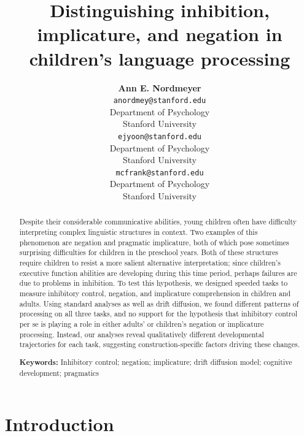 \documentclass[10pt,letterpaper]{article}
\title{Distinguishing inhibition, implicature, and negation in children's language processing}
\author{{\large \bf Ann E. Nordmeyer} \\
 \texttt{anordmey@stanford.edu} \\
 Department of Psychology \\
 Stanford University
 \And {\large \bf Erica J. Yoon} \\
 \texttt{ejyoon@stanford.edu} \\
 Department of Psychology \\
 Stanford University
 \And {\large \bf Michael C. Frank} \\
 \texttt{mcfrank@stanford.edu} \\
 Department of Psychology \\
 Stanford University}
\newcommand{\ejy}[1]{\textcolor{Blue}{[ejy: #1]}}
\newcommand{\aen}[1]{\textcolor{DarkOrange}{[aen: #1]}}
\begin{document}
\maketitle


\begin{abstract}

Despite their considerable communicative abilities, young children often have difficulty interpreting complex linguistic structures in context. Two examples of this phenomenon are negation and pragmatic implicature, both of which pose sometimes surprising difficulties for children in the preschool years. Both of these structures require children to resist a more salient alternative interpretation; since children's executive function abilities are developing during this time period, perhaps failures are due to problems in inhibition. To test this hypothesis, we designed speeded tasks to measure inhibitory control, negation, and implicature comprehension in children and adults. Using standard analyses as well as drift diffusion, we found different patterns of processing on all three tasks, and no support for the hypothesis that inhibitory control per se is playing a role in either adults' or children's negation or implicature processing. Instead, our analyses reveal qualitatively different developmental trajectories for each task, suggesting construction-specific factors driving these changes.

\textbf{Keywords:}
Inhibitory control; negation; implicature; drift diffusion model; cognitive development; pragmatics
\end{abstract}


\section{Introduction}

%
%
\end{document}
